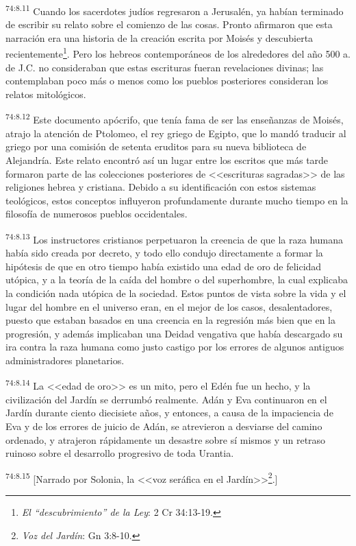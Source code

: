\par
\textsuperscript{74:8.11} Cuando los sacerdotes judíos regresaron a Jerusalén, ya habían terminado de escribir su relato sobre el comienzo de las cosas. Pronto afirmaron que esta narración era una historia de la creación escrita por Moisés y descubierta recientemente\footnote{\textit{El ``descubrimiento'' de la Ley}: 2 Cr 34:13-19.}. Pero los hebreos contemporáneos de los alrededores del año 500 a. de J.C. no consideraban que estas escrituras fueran revelaciones divinas; las contemplaban poco más o menos como los pueblos posteriores consideran los relatos mitológicos.

\par
\textsuperscript{74:8.12} Este documento apócrifo, que tenía fama de ser las enseñanzas de Moisés, atrajo la atención de Ptolomeo, el rey griego de Egipto, que lo mandó traducir al griego por una comisión de setenta eruditos para su nueva biblioteca de Alejandría. Este relato encontró así un lugar entre los escritos que más tarde formaron parte de las colecciones posteriores de <<escrituras sagradas>> de las religiones hebrea y cristiana. Debido a su identificación con estos sistemas teológicos, estos conceptos influyeron profundamente durante mucho tiempo en la filosofía de numerosos pueblos occidentales.

\par
\textsuperscript{74:8.13} Los instructores cristianos perpetuaron la creencia de que la raza humana había sido creada por decreto, y todo ello condujo directamente a formar la hipótesis de que en otro tiempo había existido una edad de oro de felicidad utópica, y a la teoría de la caída del hombre o del superhombre, la cual explicaba la condición nada utópica de la sociedad. Estos puntos de vista sobre la vida y el lugar del hombre en el universo eran, en el mejor de los casos, desalentadores, puesto que estaban basados en una creencia en la regresión más bien que en la progresión, y además implicaban una Deidad vengativa que había descargado su ira contra la raza humana como justo castigo por los errores de algunos antiguos administradores planetarios.

\par
\textsuperscript{74:8.14} La <<edad de oro>> es un mito, pero el Edén fue un hecho, y la civilización del Jardín se derrumbó realmente. Adán y Eva continuaron en el Jardín durante ciento diecisiete años, y entonces, a causa de la impaciencia de Eva y de los errores de juicio de Adán, se atrevieron a desviarse del camino ordenado, y atrajeron rápidamente un desastre sobre sí mismos y un retraso ruinoso sobre el desarrollo progresivo de toda Urantia.

\par
\textsuperscript{74:8.15} [Narrado por Solonia, la <<voz seráfica en el Jardín>>\footnote{\textit{Voz del Jardín}: Gn 3:8-10.}.]